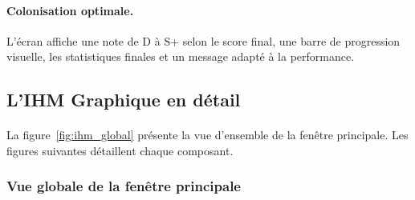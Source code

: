 \paragraph{Colonisation optimale.} L'écran affiche une note de D à S+ selon le score final, une barre de progression visuelle, les statistiques finales et un message adapté à la performance.

\bigskip

\subsection{L'IHM Graphique en détail}
\label{subsec:ihm}

\paragraph{} La figure~\ref{fig:ihm_global} présente la vue d'ensemble de la fenêtre principale. Les figures suivantes détaillent chaque composant.

\subsubsection{Vue globale de la fenêtre principale}

